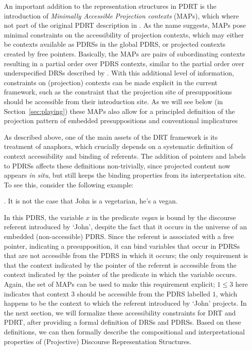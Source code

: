 An important addition to the representation structures in PDRT is the
introduction of \textit{Minimally Accessible Projection contexts} (MAPs),
which where not part of the original PDRT description in
. As the name suggests, MAPs pose minimal
constraints on the accessibility of projection contexts, which may either be
contexts available as PDRSs in the global PDRS, or projected contexts
created by free pointers.  Basically, the MAPs are pairs of subordinating
contexts resulting in a partial order over PDRS contexts, similar to the
partial order over underspecified DRSs described by
 \citeyear{reyle1993dealing,reyle1995reasoning}.
With this additional level of information, constraints on (projection)
contexts can be made explicit in the current framework, such as the
constraint that the projection site of presuppositions should be accessible
from their introduction site. As we will see below (in
Section~\ref{sec:playing}) these MAPs also allow for a principled definition
of the projection pattern of embedded presuppositions and conventional
implicatures 

As described above, one of the main assets of the DRT framework is its
treatment of anaphora, which crucially depends on a systematic definition of
context accessibility and binding of referents. The addition of pointers and
labels to PDRSs affects these definitions non-trivially, since projected
content now appears \textit{in situ}, but still keeps the binding properties
from its interpretation site. To see this, consider the following example:

\ex. It is not the case that John is a vegetarian, he's a vegan.\\\label{ex:binding}

In this PDRS, the variable $x$ in the predicate \textit{vegan} is bound by
the discourse referent introduced by `John', despite the fact that it occurs
in the universe of an embedded (non-accessible) PDRS. Since the referent is
associated with a free pointer, indicating a presupposition, it can bind
variables that occur in PDRSs that are not accessible from the PDRS in which
it occurs; the only requirement is that the context indicated by the pointer
of the referent is accessible from the context indicated by the pointer of
the predicate in which the variable occurs. Again, the set of MAPs can be
used to make this requirement explicit; $1\leq 3$ here indicates that
context $3$ should be accessible from the PDRS labelled $1$, which happens
to be the context to which the referent introduced by `John' projects.  In
the next section, we will formalize these accessibility constraints for DRT
and PDRT, after providing a formal definition of DRSs and PDRSs. Based on
these definitions, we can then formally describe the compositional and
interpretational properties of (Projective) Discourse Representation
Structures.

